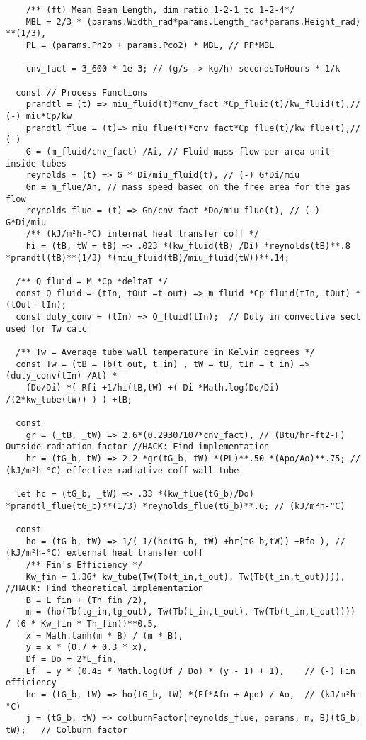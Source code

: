 \begin{verbatim}
    /** (ft) Mean Beam Length, dim ratio 1-2-1 to 1-2-4*/
    MBL = 2/3 * (params.Width_rad*params.Length_rad*params.Height_rad) **(1/3),
    PL = (params.Ph2o + params.Pco2) * MBL, // PP*MBL

    cnv_fact = 3_600 * 1e-3; // (g/s -> kg/h) secondsToHours * 1/k

  const // Process Functions
    prandtl = (t) => miu_fluid(t)*cnv_fact *Cp_fluid(t)/kw_fluid(t),// (-) miu*Cp/kw
    prandtl_flue = (t)=> miu_flue(t)*cnv_fact*Cp_flue(t)/kw_flue(t),// (-)
    G = (m_fluid/cnv_fact) /Ai, // Fluid mass flow per area unit inside tubes
    reynolds = (t) => G * Di/miu_fluid(t), // (-) G*Di/miu
    Gn = m_flue/An, // mass speed based on the free area for the gas flow
    reynolds_flue = (t) => Gn/cnv_fact *Do/miu_flue(t), // (-) G*Di/miu
    /** (kJ/m²h-°C) internal heat transfer coff */
    hi = (tB, tW = tB) => .023 *(kw_fluid(tB) /Di) *reynolds(tB)**.8 *prandtl(tB)**(1/3) *(miu_fluid(tB)/miu_fluid(tW))**.14;

  /** Q_fluid = M *Cp *deltaT */
  const Q_fluid = (tIn, tOut =t_out) => m_fluid *Cp_fluid(tIn, tOut) *(tOut -tIn);
  const duty_conv = (tIn) => Q_fluid(tIn);  // Duty in convective sect used for Tw calc

  /** Tw = Average tube wall temperature in Kelvin degrees */
  const Tw = (tB = Tb(t_out, t_in) , tW = tB, tIn = t_in) => (duty_conv(tIn) /At) *
    (Do/Di) *( Rfi +1/hi(tB,tW) +( Di *Math.log(Do/Di) /(2*kw_tube(tW)) ) ) +tB;

  const
    gr = (_tB, _tW) => 2.6*(0.29307107*cnv_fact), // (Btu/hr-ft2-F) Outside radiation factor //HACK: Find implementation
    hr = (tG_b, tW) => 2.2 *gr(tG_b, tW) *(PL)**.50 *(Apo/Ao)**.75; // (kJ/m²h-°C) effective radiative coff wall tube

  let hc = (tG_b, _tW) => .33 *(kw_flue(tG_b)/Do) *prandtl_flue(tG_b)**(1/3) *reynolds_flue(tG_b)**.6; // (kJ/m²h-°C)

  const
    ho = (tG_b, tW) => 1/( 1/(hc(tG_b, tW) +hr(tG_b,tW)) +Rfo ), // (kJ/m²h-°C) external heat transfer coff
    /** Fin's Efficiency */
    Kw_fin = 1.36* kw_tube(Tw(Tb(t_in,t_out), Tw(Tb(t_in,t_out)))), //HACK: Find theoretical implementation
    B = L_fin + (Th_fin /2),
    m = (ho(Tb(tg_in,tg_out), Tw(Tb(t_in,t_out), Tw(Tb(t_in,t_out)))) / (6 * Kw_fin * Th_fin))**0.5,
    x = Math.tanh(m * B) / (m * B),
    y = x * (0.7 + 0.3 * x),
    Df = Do + 2*L_fin,
    Ef  = y * (0.45 * Math.log(Df / Do) * (y - 1) + 1),    // (-) Fin efficiency
    he = (tG_b, tW) => ho(tG_b, tW) *(Ef*Afo + Apo) / Ao,  // (kJ/m²h-°C)
    j = (tG_b, tW) => colburnFactor(reynolds_flue, params, m, B)(tG_b, tW);   // Colburn factor


\end{verbatim}
